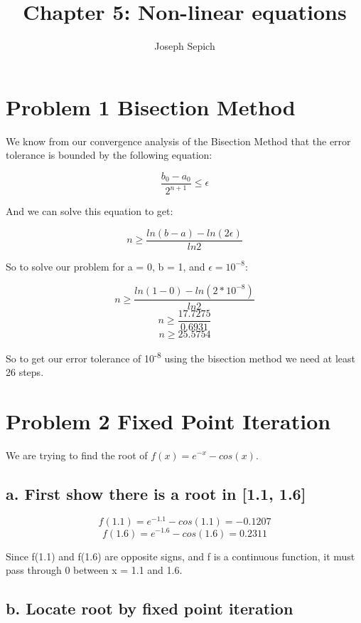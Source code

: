 \documentclass[]{article}
\title{Chapter 5: Non-linear equations}
\subtitle{Joseph Sepich}
\author{}
\date{}
\begin{document}
\maketitle

{
\setcounter{tocdepth}{2}
\tableofcontents
}
\hypertarget{problem-1-bisection-method}{%
\section{Problem 1 Bisection Method}\label{problem-1-bisection-method}}

We know from our convergence analysis of the Bisection Method that the
error tolerance is bounded by the following equation:

\[\frac{b_0 - a_0}{2^{n+1}} \leq \epsilon\]

And we can solve this equation to get:

\[n \geq \frac{ln(b - a)- ln (2\epsilon)}{ln2}\]

So to solve our problem for a = 0, b = 1, and \(\epsilon = 10^{-8}\):

\[n \geq \frac{ln(1 - 0)- ln (2*10^{-8})}{ln2}\]
\[n \geq \frac{17.7275}{0.6931}\] \[n \geq 25.5754\]

So to get our error tolerance of 10\textsuperscript{-8} using the
bisection method we need at least 26 steps.

\hypertarget{problem-2-fixed-point-iteration}{%
\section{Problem 2 Fixed Point
Iteration}\label{problem-2-fixed-point-iteration}}

We are trying to find the root of \(f(x) = e^{-x}-cos(x)\).

\hypertarget{a.-first-show-there-is-a-root-in-1.1-1.6}{%
\subsection{a. First show there is a root in {[}1.1,
1.6{]}}\label{a.-first-show-there-is-a-root-in-1.1-1.6}}

\[f(1.1) = e^{-1.1}-cos(1.1) = - 0.1207\]
\[f(1.6) = e^{-1.6}-cos(1.6) = 0.2311\]

Since f(1.1) and f(1.6) are opposite signs, and f is a continuous
function, it must pass through 0 between x = 1.1 and 1.6.

\hypertarget{b.-locate-root-by-fixed-point-iteration}{%
\subsection{b. Locate root by fixed point
iteration}\label{b.-locate-root-by-fixed-point-iteration}}
\end{document}
